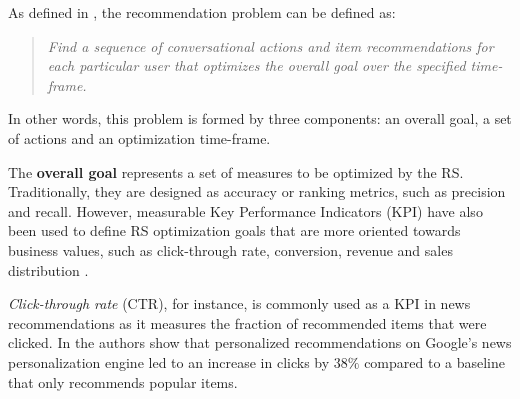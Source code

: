     As defined in \cite{2016BeyondMatrixCompletion}, the recommendation problem can be defined as: 

    \begin{quote}
      \textit{Find a sequence of conversational actions and item recommendations for each particular user that 
      optimizes the overall goal over the specified time-frame.}  
    \end{quote}
    
    In other words, this problem is formed by three components: an overall goal, a set of actions and     an optimization time-frame. 

    The \textbf{overall goal} represents a set of measures to be optimized by the RS. Traditionally, they are designed as accuracy or ranking metrics, such as precision and recall. However, measurable Key Performance Indicators (KPI)  have also been used to define RS optimization goals that are more oriented towards business values, such as click-through rate, conversion, revenue and sales distribution  \cite{2019BusinessValue}.


    
    \textit{Click-through rate} (CTR), for instance, is commonly used as a KPI in news recommendations as it measures the fraction of recommended items that were clicked. In \cite{2007GoogleNews} the authors show that personalized recommendations on Google's news personalization engine led to an increase in clicks by $38\%$ compared to a baseline that only recommends popular items. 


